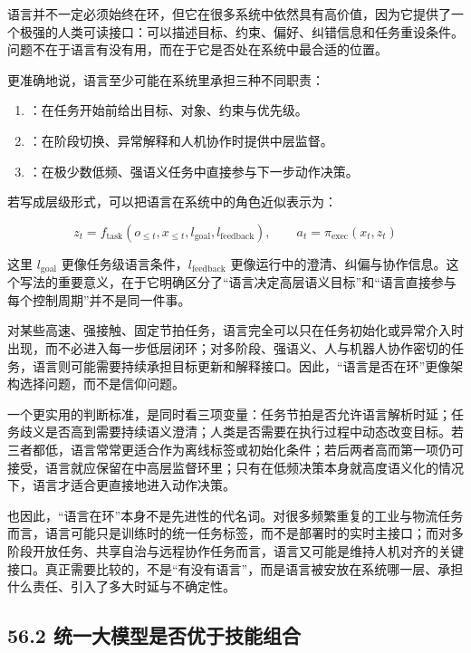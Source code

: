 语言并不一定必须始终在环，但它在很多系统中依然具有高价值，因为它提供了一个极强的人类可读接口：可以描述目标、约束、偏好、纠错信息和任务重设条件。问题不在于语言有没有用，而在于它是否处在系统中最合适的位置。

更准确地说，语言至少可能在系统里承担三种不同职责：

\begin{enumerate}
\item \texttt{}：在任务开始前给出目标、对象、约束与优先级。
\item \texttt{}：在阶段切换、异常解释和人机协作时提供中层监督。
\item \texttt{}：在极少数低频、强语义任务中直接参与下一步动作决策。
\end{enumerate}

若写成层级形式，可以把语言在系统中的角色近似表示为：

\begingroup
\scriptsize
\begin{equation*}
z_t = f_{\text{task}}(o_{\le t}, x_{\le t}, l_{\text{goal}}, l_{\text{feedback}}), \qquad
a_t = \pi_{\text{exec}}(x_t, z_t)
\end{equation*}
\endgroup

这里 \(l_{\text{goal}}\) 更像任务级语言条件，\(l_{\text{feedback}}\) 更像运行中的澄清、纠偏与协作信息。这个写法的重要意义，在于它明确区分了“语言决定高层语义目标”和“语言直接参与每个控制周期”并不是同一件事。

对某些高速、强接触、固定节拍任务，语言完全可以只在任务初始化或异常介入时出现，而不必进入每一步低层闭环；对多阶段、强语义、人与机器人协作密切的任务，语言则可能需要持续承担目标更新和解释接口。因此，“语言是否在环”更像架构选择问题，而不是信仰问题。

一个更实用的判断标准，是同时看三项变量：任务节拍是否允许语言解析时延；任务歧义是否高到需要持续语义澄清；人类是否需要在执行过程中动态改变目标。若三者都低，语言常常更适合作为离线标签或初始化条件；若后两者高而第一项仍可接受，语言就应保留在中高层监督环里；只有在低频决策本身就高度语义化的情况下，语言才适合更直接地进入动作决策。

也因此，“语言在环”本身不是先进性的代名词。对很多频繁重复的工业与物流任务而言，语言可能只是训练时的统一任务标签，而不是部署时的实时主接口；而对多阶段开放任务、共享自治与远程协作任务而言，语言又可能是维持人机对齐的关键接口。真正需要比较的，不是“有没有语言”，而是语言被安放在系统哪一层、承担什么责任、引入了多大时延与不确定性。

\subsection*{56.2 统一大模型是否优于技能组合}


